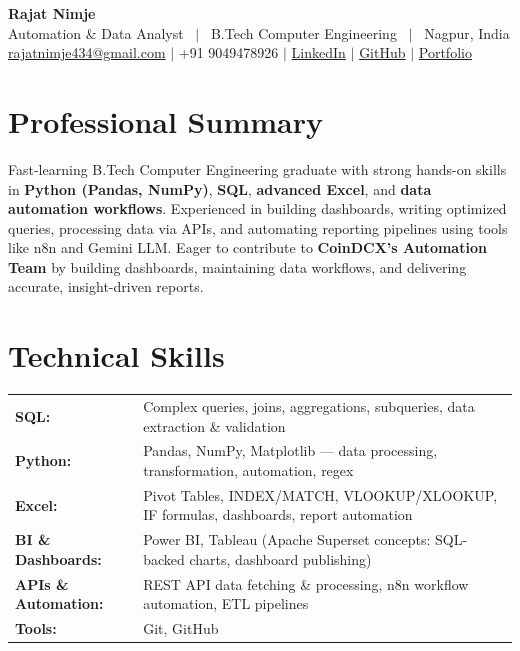 \documentclass[10.5pt,a4paper]{article}
\begin{document}
\begin{center}
  {\huge \textbf{\color{navyblue}Rajat Nimje}}\\[4pt]
  {\normalsize Automation \& Data Analyst \ $|$ \ B.Tech Computer Engineering \ $|$ \ Nagpur, India}\\[5pt]
  \href{mailto:rajatnimje434@gmail.com}{rajatnimje434@gmail.com} \;$|$\;
  +91 9049478926 \;$|$\;
  \href{https://www.linkedin.com/in/connect-with-rajat-nimje/}{LinkedIn} \;$|$\;
  \href{https://github.com/rajat2003fg}{GitHub} \;$|$\;
  \href{https://rajat2003fg.github.io/Portfolio/}{Portfolio}
\end{center}

\vspace{3pt}

\section{Professional Summary}
Fast-learning B.Tech Computer Engineering graduate with strong hands-on skills in
\textbf{Python (Pandas, NumPy)}, \textbf{SQL}, \textbf{advanced Excel}, and \textbf{data automation workflows}.
Experienced in building dashboards, writing optimized queries, processing data via APIs, and
automating reporting pipelines using tools like n8n and Gemini LLM.
Eager to contribute to \textbf{CoinDCX's Automation Team} by building dashboards, maintaining
data workflows, and delivering accurate, insight-driven reports.

\section{Technical Skills}
\begin{tabularx}{\textwidth}{@{}l X@{}}
\textbf{SQL:}              & Complex queries, joins, aggregations, subqueries, data extraction \& validation \\[2pt]
\textbf{Python:}           & Pandas, NumPy, Matplotlib --- data processing, transformation, automation, regex \\[2pt]
\textbf{Excel:}            & Pivot Tables, INDEX/MATCH, VLOOKUP/XLOOKUP, IF formulas, dashboards, report automation \\[2pt]
\textbf{BI \& Dashboards:} & Power BI, Tableau (Apache Superset concepts: SQL-backed charts, dashboard publishing) \\[2pt]
\textbf{APIs \& Automation:} & REST API data fetching \& processing, n8n workflow automation, ETL pipelines \\[2pt]
\textbf{Tools:}            & Git, GitHub \\
\end{tabularx}
\end{document}
